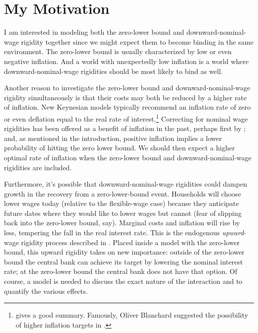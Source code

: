 \documentclass[12pt,a4paper]{scrartcl}            %
\begin{document}
\section{My Motivation}
\label{sec:my_motivation}

I am interested in modeling both the zero-lower bound and downward-nominal-wage rigidity together since we might expect them to become binding in the same environment.
The zero-lower bound is usually characterized by low or even negative inflation.
And a world with unexpectedly low inflation is a world where downward-nominal-wage rigidities should be most likely to bind as well.

Another reason to investigate the zero-lower bound and downward-nominal-wage rigidity simultaneously is that their costs may both be reduced by a higher rate of inflation.
New Keynesian models typically recommend an inflation rate of zero or even deflation equal to the real rate of interest.\footnote{\cite{schmitt-grohe_uribe_2010} gives a good summary.  Famously, Oliver Blanchard suggested the possibility of higher inflation targets in \cite{blanchard_dellariccia_and_mauro}.}
Correcting for nominal wage rigidities has been offered as a benefit of inflation in the past, perhaps first by \cite{tobin_1972};
and, as mentioned in the introduction, positive inflation implies a lower probability of hitting the zero lower bound.
We should then expect a higher optimal rate of inflation when the zero-lower bound and downward-nominal-wage rigidities are included.

Furthermore, it's possible that downward-nominal-wage rigidities could dampen growth in the recovery from a zero-lower-bound event.
Households will choose lower wages today (relative to the flexible-wage case) because they anticipate future dates where they would like to lower wages but cannot (fear of slipping back into the zero-lower bound, say).
Marginal costs and inflation will rise by less, tempering the fall in the real interest rate.
This is the endogenous \emph{upward}-wage rigidity process described in \cite{elsby_2009}.
Placed inside a model with the zero-lower bound, this upward rigidity takes on new importance:
outside of the zero-lower bound the central bank can achieve its target by lowering the nominal interest rate;
at the zero-lower bound the central bank does not have that option.
Of course, a model is needed to discuss the exact nature of the interaction and to quantify the various effects.
\end{document}
